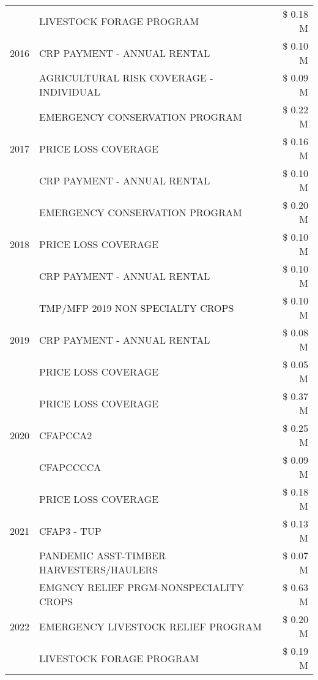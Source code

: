 \begin{tabular}{llr}
\cline{1-3}
\multirow[t]{3}{*}{2016} & LIVESTOCK FORAGE PROGRAM & \$ 0.18 M \\
 & CRP PAYMENT - ANNUAL RENTAL & \$ 0.10 M \\
 & AGRICULTURAL RISK COVERAGE - INDIVIDUAL & \$ 0.09 M \\
\cline{1-3}
\multirow[t]{3}{*}{2017} & EMERGENCY CONSERVATION PROGRAM & \$ 0.22 M \\
 & PRICE LOSS COVERAGE & \$ 0.16 M \\
 & CRP PAYMENT - ANNUAL RENTAL & \$ 0.10 M \\
\cline{1-3}
\multirow[t]{3}{*}{2018} & EMERGENCY CONSERVATION PROGRAM & \$ 0.20 M \\
 & PRICE LOSS COVERAGE & \$ 0.10 M \\
 & CRP PAYMENT - ANNUAL RENTAL & \$ 0.10 M \\
\cline{1-3}
\multirow[t]{3}{*}{2019} & TMP/MFP 2019 NON SPECIALTY CROPS & \$ 0.10 M \\
 & CRP PAYMENT - ANNUAL RENTAL & \$ 0.08 M \\
 & PRICE LOSS COVERAGE & \$ 0.05 M \\
\cline{1-3}
\multirow[t]{3}{*}{2020} & PRICE LOSS COVERAGE & \$ 0.37 M \\
 & CFAPCCA2 & \$ 0.25 M \\
 & CFAPCCCCA & \$ 0.09 M \\
\cline{1-3}
\multirow[t]{3}{*}{2021} & PRICE LOSS COVERAGE & \$ 0.18 M \\
 & CFAP3 - TUP & \$ 0.13 M \\
 & PANDEMIC ASST-TIMBER HARVESTERS/HAULERS & \$ 0.07 M \\
\cline{1-3}
\multirow[t]{3}{*}{2022} & EMGNCY RELIEF PRGM-NONSPECIALITY CROPS & \$ 0.63 M \\
 & EMERGENCY LIVESTOCK RELIEF PROGRAM & \$ 0.20 M \\
 & LIVESTOCK FORAGE PROGRAM & \$ 0.19 M \\
\cline{1-3}
\bottomrule
\end{tabular}
